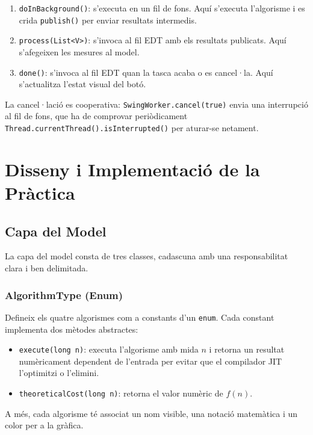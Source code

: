 \documentclass[conference,compsoc]{IEEEtran}
\begin{document}
\begin{enumerate}
    \item \texttt{doInBackground()}: s'executa en un fil de fons. Aquí
          s'executa l'algorisme i es crida \texttt{publish()} per enviar
          resultats intermedis.
    \item \texttt{process(List<V>)}: s'invoca al fil EDT amb els resultats
          publicats. Aquí s'afegeixen les mesures al model.
    \item \texttt{done()}: s'invoca al fil EDT quan la tasca acaba o es
          cancel·la. Aquí s'actualitza l'estat visual del botó.
\end{enumerate}

La cancel·lació es cooperativa: \texttt{SwingWorker.cancel(true)} envia
una interrupció al fil de fons, que ha de comprovar periòdicament
\texttt{Thread.currentThread().isInterrupted()} per aturar-se netament.

\section{Disseny i Implementació de la Pràctica}

\subsection{Capa del Model}

La capa del model consta de tres classes, cadascuna amb una responsabilitat
clara i ben delimitada.

\subsubsection{AlgorithmType (Enum)}

Defineix els quatre algorismes com a constants d'un \texttt{enum}. Cada
constant implementa dos mètodes abstractes:
\begin{itemize}
    \item \texttt{execute(long n)}: executa l'algorisme amb mida $n$ i
          retorna un resultat numèricament dependent de l'entrada per
          evitar que el compilador JIT l'optimitzi o l'elimini.
    \item \texttt{theoreticalCost(long n)}: retorna el valor numèric de
          $f(n)$.
\end{itemize}

A més, cada algorisme té associat un nom visible, una notació matemàtica
i un color per a la gràfica.
\end{document}
